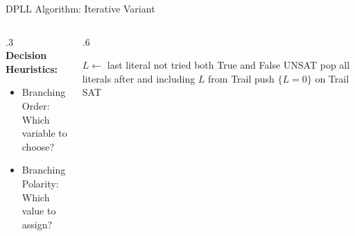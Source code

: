 \documentclass[t]{sdqbeamer}
\begin{document}
\begin{frame}{DPLL Algorithm: Iterative Variant}
\begin{columns}[T]
\begin{column}{.3\linewidth}
~\\[1em]
\textbf{Decision Heuristics:}~\\[1em]
\begin{itemize}\setlength{\itemsep}{1em}
	\item Branching Order:\\[1ex] Which variable to choose?
	\item Branching Polarity:\\[1ex] Which value to assign?
\end{itemize}
\end{column}
\begin{column}{.6\linewidth}
\begin{algorithm}[H]
\DontPrintSemicolon
\caption{iterativeDPLL(CNF Formula $F$)}
\BlankLine

 {
	 {
		$L \leftarrow$ last literal not tried both True and False\;
		 {\Return UNSAT}
		pop all literals after and including $L$ from Trail\;
		push $\{ L = 0 \}$ on Trail\;
	}
}
\Return SAT\;
\end{algorithm}
\end{column}
\end{columns}
\end{frame}
\end{document}
